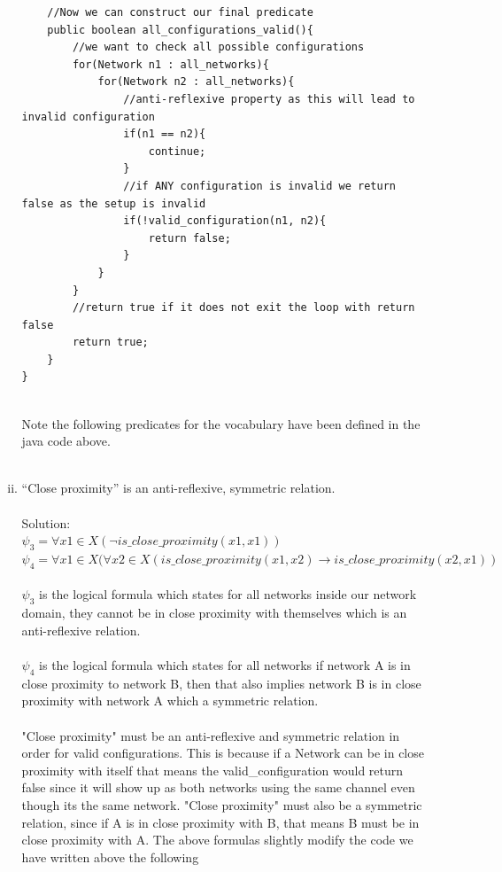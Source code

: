 \documentclass{article}
\newcommand*\moveToRight[1]{\hspace*{0em plus 1fill}\makebox{(#1)}}
\begin{document}
\begin{enumerate}[(a)]
\begin{enumerate}[(i)]
\begin{lstlisting}
    //Now we can construct our final predicate
    public boolean all_configurations_valid(){
        //we want to check all possible configurations
        for(Network n1 : all_networks){
            for(Network n2 : all_networks){
                //anti-reflexive property as this will lead to invalid configuration
                if(n1 == n2){
                    continue;
                }
                //if ANY configuration is invalid we return false as the setup is invalid
                if(!valid_configuration(n1, n2){
                    return false;
                }
            }
        }
        //return true if it does not exit the loop with return false
        return true;
    }
}
                \end{lstlisting}\\
            Note the following predicates for the vocabulary have been defined in the java code above.\\\\
            \item “Close proximity” is an anti-reflexive, symmetric relation. \moveToRight{2 marks}\\\\
            Solution: \\
            $\psi_3 = \forall x1 \in X(\neg is\_close\_proximity(x1,x1))$\\
            $\psi_4 = \forall x1 \in X(\forall x2 \in X(is\_close\_proximity(x1,x2) \to is\_close\_proximity(x2,x1))$\\\\
            $\psi_3$ is the logical formula which states for all networks inside our network domain, they cannot be in close proximity with themselves which is an anti-reflexive relation.\\\\
            $\psi_4$ is the logical formula which states for all networks if network A is in close proximity to network B, then that also implies network B is in close proximity with network A which a symmetric relation.\\\\
            "Close proximity" must be an anti-reflexive and symmetric relation in order for valid configurations. This is because if a Network can be in close proximity with itself that means the valid\_configuration would return false since it will show up as both networks using the same channel even though its the same network. "Close proximity" must also be a symmetric relation, since if A is in close proximity with B, that means B must be in close proximity with A. The above formulas slightly modify the code we have written above the following\\

\end{enumerate}
\end{enumerate}
\end{document}
